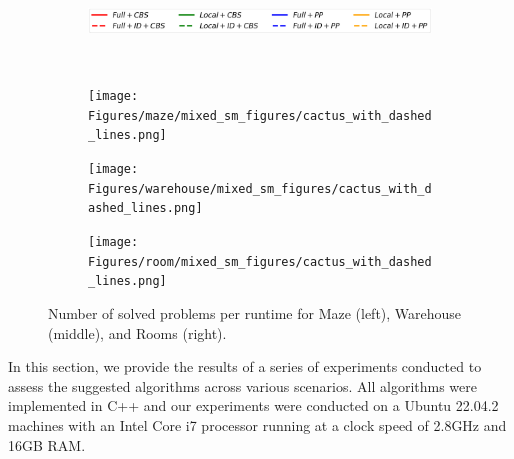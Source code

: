 \documentclass[letterpaper]{article} %
\def\
UrlFont{\rm}  %
\theoremstyle{definition}
\begin{document}
\begin{figure}[tbhp]
    \begin{subfigure}[b]{0.9\columnwidth}\centering
      \includegraphics[width=\columnwidth]{Figures/legends_cactus_dashed_lines.png}
    \end{subfigure}\\
    \centering
    \begin{subfigure}[b]{0.69\columnwidth}\centering
      \texttt{[image: Figures/maze/mixed\_sm\_figures/cactus\_with\_dashed\_lines.png]}
    \end{subfigure}
    \begin{subfigure}[b]{0.69\columnwidth}\centering
      \texttt{[image: Figures/warehouse/mixed\_sm\_figures/cactus\_with\_dashed\_lines.png]}
    \end{subfigure}
    \begin{subfigure}[b]{0.69\columnwidth}\centering
      \texttt{[image: Figures/room/mixed\_sm\_figures/cactus\_with\_dashed\_lines.png]}
    \end{subfigure}
    \caption{Number of solved problems per runtime for Maze (left), Warehouse (middle), and Rooms (right).}
    \label{fig:cactus-w-dashed-lines}
\end{figure}

In this section, we provide the results of a series of experiments conducted to assess the suggested algorithms across various scenarios. All algorithms were implemented in C++ and our experiments were conducted on a Ubuntu 22.04.2  machines with an Intel Core i7 processor running at a clock speed of 2.8GHz and 16GB RAM.
\end{document}
